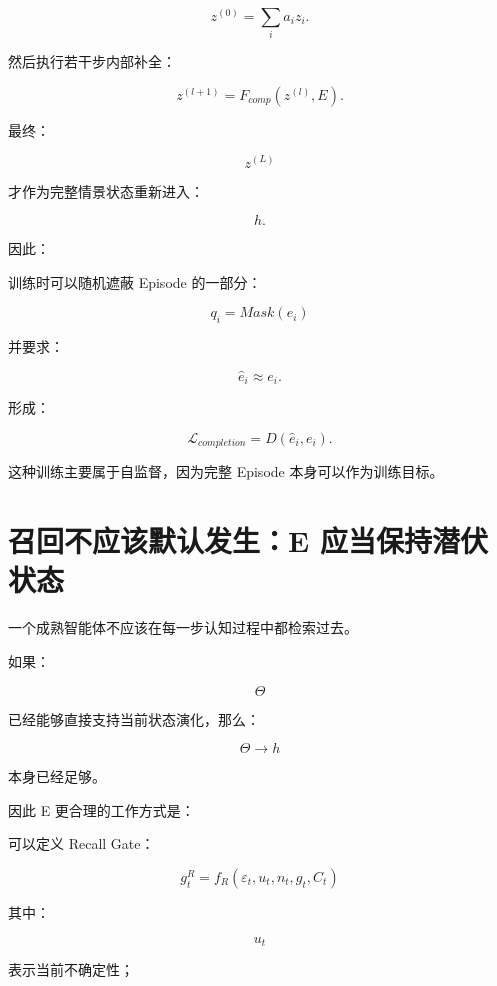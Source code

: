 \[
z^{(0)}
=
\sum_i a_iz_i.
\]

然后执行若干步内部补全：

\[
\boxed{
z^{(l+1)}
=
F_{comp}
\left(
z^{(l)},
E
\right).
}
\]

最终：

\[
z^{(L)}
\]

才作为完整情景状态重新进入：

\[
h.
\]

因此：

\begin{statementbox}
\centering
{}
\end{statementbox}

训练时可以随机遮蔽 Episode 的一部分：

\[
q_i=
Mask(e_i)
\]

并要求：

\[
\hat e_i
\approx e_i.
\]

形成：

\[
\boxed{
\mathcal L_{completion}
=
D(
\hat e_i,
e_i
).
}
\]

这种训练主要属于自监督，因为完整 Episode 本身可以作为训练目标。


\section{召回不应该默认发生：E 应当保持潜伏状态}

一个成熟智能体不应该在每一步认知过程中都检索过去。

如果：

\[
\Theta
\]

已经能够直接支持当前状态演化，那么：

\[
\Theta\rightarrow h
\]

本身已经足够。

因此 E 更合理的工作方式是：

\begin{statementbox}
\centering
{}
\end{statementbox}

可以定义 Recall Gate：

\[
g_t^R
=
f_R
\left(
\varepsilon_t,
u_t,
n_t,
g_t,
C_t
\right)
\]

其中：

\[
u_t
\]

表示当前不确定性；

